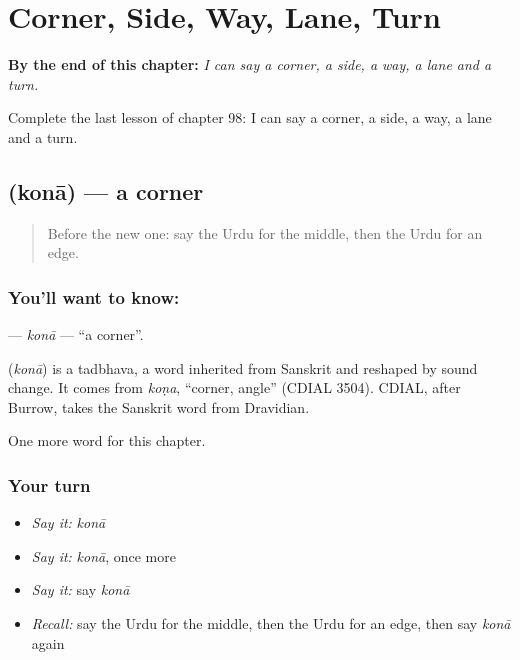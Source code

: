 
\chapter{Corner, Side, Way, Lane, Turn}
\label{ch:ur-corner-side-way-lane-turn}

\begin{chapteropening}
\textbf{By the end of this chapter:} \emph{I can say a corner, a side, a way, a lane and a turn.}

Complete the last lesson of chapter 98: I can say a corner, a side, a way, a lane and a turn.
\end{chapteropening}

\section[\texorpdfstring{\ur{کونا} (konā)}{کونا (konā)}]{ (konā) — a corner}

\label{lesson:UR-C98-kona}



\begin{quote}
Before the new one: say the Urdu for the middle, then the Urdu for an edge.
\end{quote}

\subsection*{You'll want to know: }
\textbf{} — \emph{konā} — \textquotedblleft{}a corner\textquotedblright{}.

\begin{cousinweb}
\textbf{} (\emph{konā}) is a tadbhava, a word inherited from Sanskrit and reshaped by sound change. It comes from \emph{koṇa}, \textquotedblleft{}corner, angle\textquotedblright{} (CDIAL 3504). CDIAL, after Burrow, takes the Sanskrit word from Dravidian.
\end{cousinweb}

\begin{grammarlens}[title={What you've built}]
One more word for this chapter.
\end{grammarlens}

\subsection*{Your turn}
\begin{itemize}
\raggedright
  \item \emph{Say it:} \emph{konā}
  \item \emph{Say it:} \emph{konā}, once more
  \item \emph{Say it:} say \emph{konā}
  \item \emph{Recall:} say the Urdu for the middle, then the Urdu for an edge, then say \emph{konā} again
\end{itemize}

